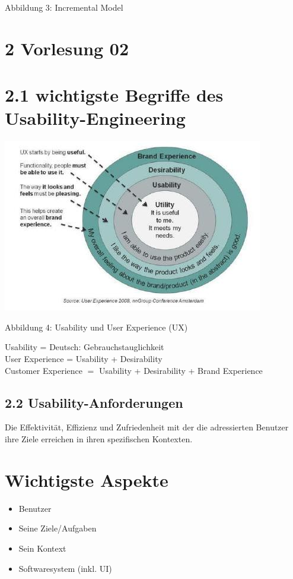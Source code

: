 \documentclass[10pt]{article}
\begin{document}
Abbildung 3: Incremental Model

\section*{2 Vorlesung 02}
\section*{2.1 wichtigste Begriffe des Usability-Engineering}
\begin{center}
\includegraphics[max width=\textwidth]{2024_12_29_0d1d7b5551ea1b4b41bdg-02}
\end{center}

\begin{displayquote}
Abbildung 4: Usability und User Experience (UX)
\end{displayquote}

Usability = Deutsch: Gebrauchstauglichkeit\\
User Experience = Usability + Desirability\\
Customer Experience $=$ Usability + Desirability + Brand Experience

\subsection*{2.2 Usability-Anforderungen}
Die Effektivität, Effizienz und Zufriedenheit mit der die adressierten Benutzer ihre Ziele erreichen in ihren spezifischen Kontexten.

\section*{Wichtigste Aspekte}
\begin{itemize}
  \item Benutzer
  \item Seine Ziele/Aufgaben
  \item Sein Kontext
  \item Softwaresystem (inkl. UI)
\end{itemize}
\end{document}

